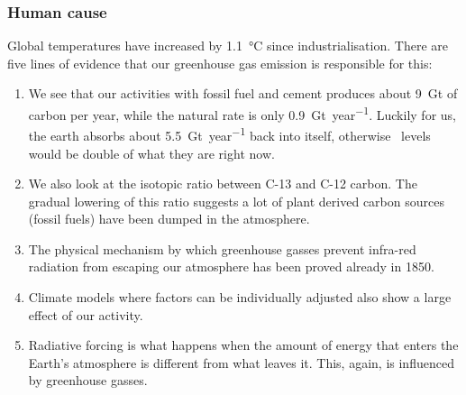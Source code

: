 \documentclass[../summary.tex]{subfiles}
\begin{document}
\subsubsection{Human cause}
Global temperatures have increased by \SI{1.1}{\degreeCelsius} since industrialisation. There are five lines of evidence that our greenhouse gas emission is responsible for this:
\begin{enumerate}
	\item We see that our activities with fossil fuel and cement produces about \SI{9}{\giga\tonne} of carbon per year, while the natural rate is only \SI{0.9}{\giga\tonne\per year}. Luckily for us, the earth absorbs about \SI{5.5}{\giga\tonne\per year} back into itself, otherwise \COtwo\ levels would be double of what they are right now.
	\item We also look at the isotopic ratio between C-13 and C-12 carbon. The gradual lowering of this ratio suggests a lot of plant derived carbon sources (fossil fuels) have been dumped in the atmosphere.
	\item The physical mechanism by which greenhouse gasses prevent infra-red radiation from escaping our atmosphere has been proved already in 1850.
	\item Climate models where factors can be individually adjusted also show a large effect of our activity.
	\item Radiative forcing is what happens when the amount of energy that enters the Earth's atmosphere is different from what leaves it. This, again, is influenced by greenhouse gasses.
\end{enumerate}
\end{document}
